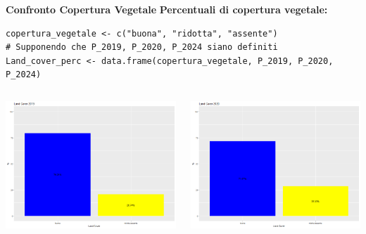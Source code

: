\documentclass{beamer}
\begin{document}
\begin{frame}[fragile]{\textbf{Confronto Copertura Vegetale}}
\textbf{Percentuali di copertura vegetale:}
\begin{lstlisting}
copertura_vegetale <- c("buona", "ridotta", "assente")
# Supponendo che P_2019, P_2020, P_2024 siano definiti
Land_cover_perc <- data.frame(copertura_vegetale, P_2019, P_2020, P_2024)
\end{lstlisting}

\begin{columns}
    \centering
    \includegraphics[width=\textwidth]{Percentuali_Land_Cover_2019.png}
    
    \centering
    \includegraphics[width=\textwidth]{Percentuali_Land_Cover_2020.png}
    

\end{columns}
\end{frame}
\end{document}
